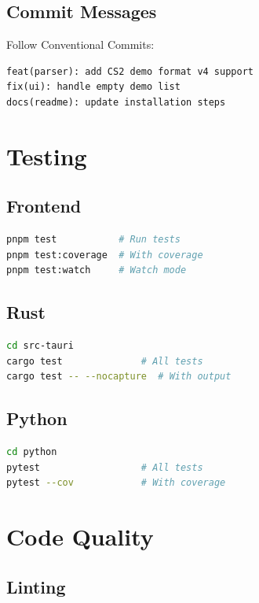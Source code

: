 \subsection{Commit Messages}

Follow Conventional Commits:

\begin{lstlisting}
feat(parser): add CS2 demo format v4 support
fix(ui): handle empty demo list
docs(readme): update installation steps
\end{lstlisting}

\section{Testing}

\subsection{Frontend}

\begin{lstlisting}[language=bash]
pnpm test           # Run tests
pnpm test:coverage  # With coverage
pnpm test:watch     # Watch mode
\end{lstlisting}

\subsection{Rust}

\begin{lstlisting}[language=bash]
cd src-tauri
cargo test              # All tests
cargo test -- --nocapture  # With output
\end{lstlisting}

\subsection{Python}

\begin{lstlisting}[language=bash]
cd python
pytest                  # All tests
pytest --cov            # With coverage
\end{lstlisting}

\section{Code Quality}

\subsection{Linting}

